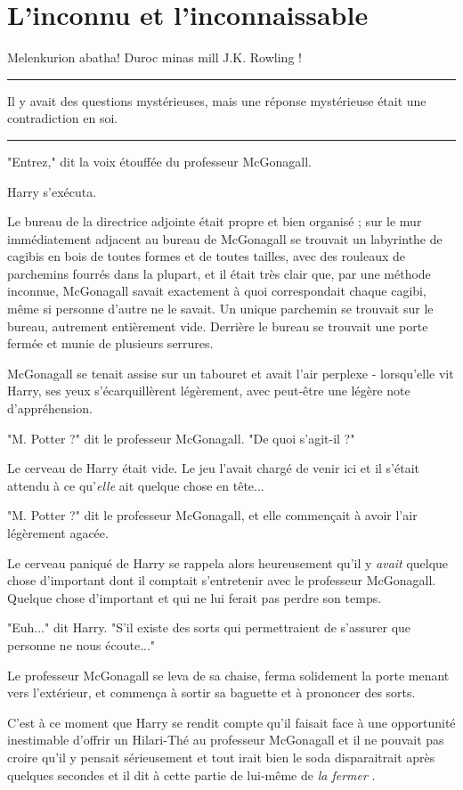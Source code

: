 
\chapter{L'inconnu et l'inconnaissable}

Melenkurion abatha! Duroc minas mill J.K. Rowling !
\par\noindent\rule{\textwidth}{0.4pt}
Il y avait des questions mystérieuses, mais une réponse mystérieuse était une contradiction en soi.
\par\noindent\rule{\textwidth}{0.4pt}
"Entrez," dit la voix étouffée du professeur McGonagall.

Harry s'exécuta.

Le bureau de la directrice adjointe était propre et bien organisé ; sur le mur immédiatement adjacent au bureau de McGonagall se trouvait un labyrinthe de cagibis en bois de toutes formes et de toutes tailles, avec des rouleaux de parchemins fourrés dans la plupart, et il était très clair que, par une méthode inconnue, McGonagall savait exactement à quoi correspondait chaque cagibi, même si personne d'autre ne le savait. Un unique parchemin se trouvait sur le bureau, autrement entièrement vide. Derrière le bureau se trouvait une porte fermée et munie de plusieurs serrures.

McGonagall se tenait assise sur un tabouret et avait l'air perplexe - lorsqu'elle vit Harry, ses yeux s'écarquillèrent légèrement, avec peut-être une légère note d'appréhension.

"M. Potter ?" dit le professeur McGonagall. "De quoi s'agit-il ?"

Le cerveau de Harry était vide. Le jeu l'avait chargé de venir ici et il s'était attendu à ce qu'\emph{elle}  ait quelque chose en tête...

"M. Potter ?" dit le professeur McGonagall, et elle commençait à avoir l'air légèrement agacée.

Le cerveau paniqué de Harry se rappela alors heureusement qu'il y \emph{avait}  quelque chose d'important dont il comptait s'entretenir avec le professeur McGonagall. Quelque chose d'important et qui ne lui ferait pas perdre son temps.

"Euh..." dit Harry. "S'il existe des sorts qui permettraient de s'assurer que personne ne nous écoute..."

Le professeur McGonagall se leva de sa chaise, ferma solidement la porte menant vers l'extérieur, et commença à sortir sa baguette et à prononcer des sorts.

C'est à ce moment que Harry se rendit compte qu'il faisait face à une opportunité inestimable d'offrir un Hilari-Thé au professeur McGonagall et il ne pouvait pas croire qu'il y pensait sérieusement et tout irait bien le soda disparaitrait après quelques secondes et il dit à cette partie de lui-même de \emph{la fermer} .


